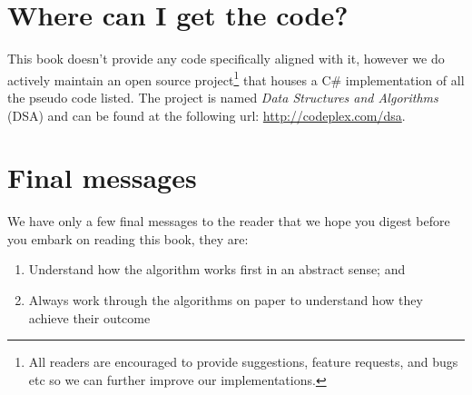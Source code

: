\section{Where can I get the code?}
This book doesn't provide any code specifically aligned with it, however we do actively maintain an open source project\footnote{All readers are encouraged to provide suggestions, feature requests, and bugs etc so we can further improve our implementations.} that houses a C\# implementation of all the pseudo code listed. The project is named \textit{Data Structures and Algorithms} (DSA) and can be found at the following url: \url{http://codeplex.com/dsa}.

\section{Final messages}
We have only a few final messages to the reader that we hope you digest before you embark on reading this book, they are:

\begin{enumerate}
\item Understand how the algorithm works first in an abstract sense; and
\item Always work through the algorithms on paper to understand how they achieve their outcome
\end{enumerate}

